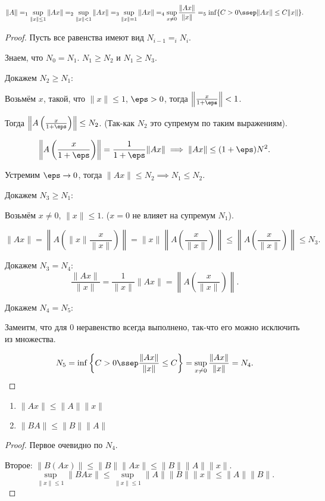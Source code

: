 \begin{theorem} \thmslashn

    \[ \|A\| =_{1} \sup\limits_{\|x\| \le 1} \|Ax\| =_{2} \sup\limits_{\|x\| < 1} \|Ax\| =_{3} \sup\limits_{\|x\| = 1} \|Ax\| =_{4} \sup\limits_{x \neq 0} \frac{\|Ax\|}{\|x\|} =_{5} \inf \{C > 0 \ssep \|Ax\| \le C \|x\|\}   .\]
    \begin{proof} \thmslashn

        Пусть все равенства имеют вид $N_{i-1} =_{i} N_{i}$.

        Знаем, что $N_0 = N_1$. $N_1 \ge N_2$ и $N_1 \ge N_3$.

        Докажем $N_2 \ge N_1$:

        Возьмём $x$, такой, что $\|x\| \le  1$, $\eps > 0$, тогда $\left\|\frac{x}{1+\eps}\right\| < 1$. 

        Тогда $\left\|A\left( \frac{x}{1+\eps} \right) \right\| \le N_2$. (Так-как $N_2$ это супремум по таким выражениям).

        \[ \left\|A\left( \frac{x}{1+\eps} \right) \right\| = \frac{1}{1+\eps} \|Ax\| \implies \|Ax\| \le (1+\eps)N^2 .\]

        Устремим $\eps \to 0$, тогда $\|Ax\| \le N_2 \implies N_1 \le N_2$.

        Докажем $N_3 \ge N_1$:

        Возьмём $x \neq 0$, $\|x\| \le 1$. ($x=0$ не влияет на супремум $N_1$).

        \[ \|Ax\| = \left\|A(\|x\| \frac{x}{\|x\|})\right\| = \|x\| \left\|A\left( \frac{x}{\|x\|} \right) \right\| \le \left\|A\left( \frac{x}{\|x\|} \right) \right\| \le N_{3}.\] 

        Докажем $N_3 = N_4$: 
        \[ \frac{\|Ax\|}{\|x\|} = \frac{1}{\|x\|} \|Ax\| = \left\|A\left( \frac{x}{\|x\|} \right) \right\| .\]

        Докажем $N_4 = N_5$:

        Замеитм, что для $0$ неравенство всегда выполнено, так-что его можно исключить из множества.

        \[ N_5 = \inf \left\{C > 0 \ssep \frac{\|Ax\|}{\|x\|} \le C\right\} = \sup\limits_{x \neq 0} \frac{\|Ax\|}{\|x\|} = N_4  .\] 
    \end{proof}
\end{theorem}
\begin{consequence} \thmslashn

    \begin{enumerate}
        \item $\|Ax\| \le \|A\| \|x\|$ 
        \item $\|BA\| \le \|B\|\|A\|$
    \end{enumerate}
    \begin{proof} \thmslashn
        
        Первое очевидно по $N_4$. 
        
        Второе: $\|B(Ax)\| \le \|B\|\|Ax\| \le \|B\|\|A\|\|x\|$.
        \[ \sup\limits_{\|x\| \le 1} \|BAx\| \le \sup\limits_{\|x\| \le 1} \|A\|\|B\|\|x\| \le \|A\|\|B\| .\] 
    \end{proof}
\end{consequence}
